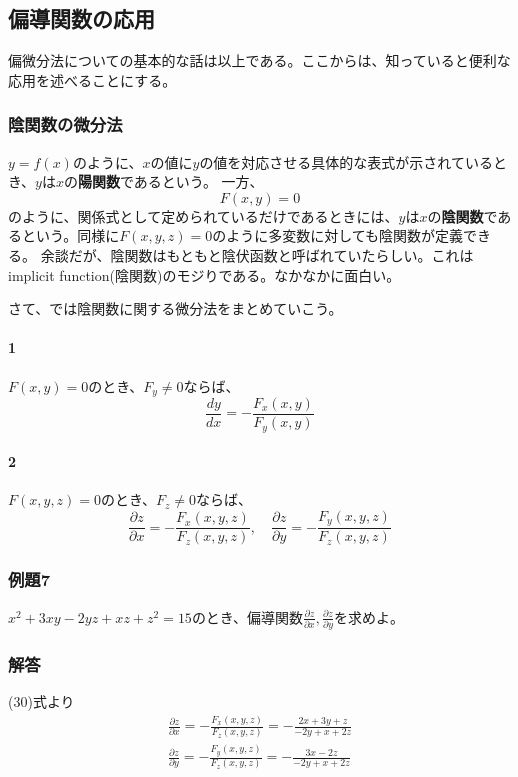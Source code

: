 \documentclass[a4j,dvipdfmx]{jsarticle}
\begin{document}
\subsection{偏導関数の応用}
偏微分法についての基本的な話は以上である。ここからは、知っていると便利な応用を述べることにする。
\subsubsection{陰関数の微分法}
$y=f(x)$のように、$x$の値に$y$の値を対応させる具体的な表式が示されているとき、$y$は$x$の\textbf{陽関数}であるという。
一方、
\begin{equation}
    F(x,y)=0
\end{equation}
のように、関係式として定められているだけであるときには、$y$は$x$の\textbf{陰関数}であるという。同様に$F(x,y,z)=0$のように多変数に対しても陰関数が定義できる。
余談だが、陰関数はもともと陰伏函数と呼ばれていたらしい。これはimplicit function(陰関数)のモジりである。なかなかに面白い。

さて、では陰関数に関する微分法をまとめていこう。
\paragraph{1}
$F(x,y)=0$のとき、$F_y\neq 0$ならば、
\begin{equation}
    \frac{dy}{dx}=-\frac{F_x(x,y)}{F_y(x,y)}
\end{equation}
\paragraph{2}
$F(x,y,z)=0$のとき、$F_z\neq 0$ならば、
\begin{equation}
    \frac{\partial z}{\partial x}=-\frac{F_x(x,y,z)}{F_z(x,y,z)},\quad\frac{\partial z}{\partial y}=-\frac{F_y(x,y,z)}{F_z(x,y,z)}
\end{equation}

\subsubsection*{例題7}
$x^2+3xy-2yz+xz+z^2=15$のとき、偏導関数$\displaystyle\frac{\partial z}{\partial x},\frac{\partial z}{\partial y}$を求めよ。

\subsubsection*{解答}
(30)式より
\begin{align*}
    \frac{\partial z}{\partial x}=-\frac{F_x(x,y,z)}{F_z(x,y,z)}=-\frac{2x+3y+z}{-2y+x+2z}\\
    \frac{\partial z}{\partial y}=-\frac{F_y(x,y,z)}{F_z(x,y,z)}=-\frac{3x-2z}{-2y+x+2z}
\end{align*}
\end{document}

